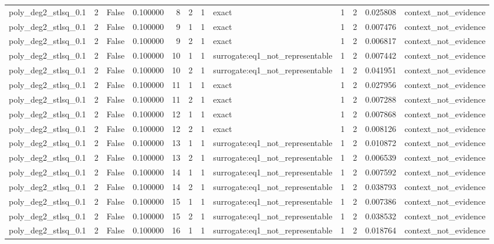 \begin{tabular}{lrrrrrrlrrrl}
poly\_deg2\_stlsq\_0.1 & 2 & False & 0.100000 & 8 & 2 & 1 & exact & 1 & 2 & 0.025808 & context\_not\_evidence \\
poly\_deg2\_stlsq\_0.1 & 2 & False & 0.100000 & 9 & 1 & 1 & exact & 1 & 2 & 0.007476 & context\_not\_evidence \\
poly\_deg2\_stlsq\_0.1 & 2 & False & 0.100000 & 9 & 2 & 1 & exact & 1 & 2 & 0.006817 & context\_not\_evidence \\
poly\_deg2\_stlsq\_0.1 & 2 & False & 0.100000 & 10 & 1 & 1 & surrogate:eq1\_not\_representable & 1 & 2 & 0.007442 & context\_not\_evidence \\
poly\_deg2\_stlsq\_0.1 & 2 & False & 0.100000 & 10 & 2 & 1 & surrogate:eq1\_not\_representable & 1 & 2 & 0.041951 & context\_not\_evidence \\
poly\_deg2\_stlsq\_0.1 & 2 & False & 0.100000 & 11 & 1 & 1 & exact & 1 & 2 & 0.027956 & context\_not\_evidence \\
poly\_deg2\_stlsq\_0.1 & 2 & False & 0.100000 & 11 & 2 & 1 & exact & 1 & 2 & 0.007288 & context\_not\_evidence \\
poly\_deg2\_stlsq\_0.1 & 2 & False & 0.100000 & 12 & 1 & 1 & exact & 1 & 2 & 0.007868 & context\_not\_evidence \\
poly\_deg2\_stlsq\_0.1 & 2 & False & 0.100000 & 12 & 2 & 1 & exact & 1 & 2 & 0.008126 & context\_not\_evidence \\
poly\_deg2\_stlsq\_0.1 & 2 & False & 0.100000 & 13 & 1 & 1 & surrogate:eq1\_not\_representable & 1 & 2 & 0.010872 & context\_not\_evidence \\
poly\_deg2\_stlsq\_0.1 & 2 & False & 0.100000 & 13 & 2 & 1 & surrogate:eq1\_not\_representable & 1 & 2 & 0.006539 & context\_not\_evidence \\
poly\_deg2\_stlsq\_0.1 & 2 & False & 0.100000 & 14 & 1 & 1 & surrogate:eq1\_not\_representable & 1 & 2 & 0.007592 & context\_not\_evidence \\
poly\_deg2\_stlsq\_0.1 & 2 & False & 0.100000 & 14 & 2 & 1 & surrogate:eq1\_not\_representable & 1 & 2 & 0.038793 & context\_not\_evidence \\
poly\_deg2\_stlsq\_0.1 & 2 & False & 0.100000 & 15 & 1 & 1 & surrogate:eq1\_not\_representable & 1 & 2 & 0.007386 & context\_not\_evidence \\
poly\_deg2\_stlsq\_0.1 & 2 & False & 0.100000 & 15 & 2 & 1 & surrogate:eq1\_not\_representable & 1 & 2 & 0.038532 & context\_not\_evidence \\
poly\_deg2\_stlsq\_0.1 & 2 & False & 0.100000 & 16 & 1 & 1 & surrogate:eq1\_not\_representable & 1 & 2 & 0.018764 & context\_not\_evidence \\

\end{tabular}
